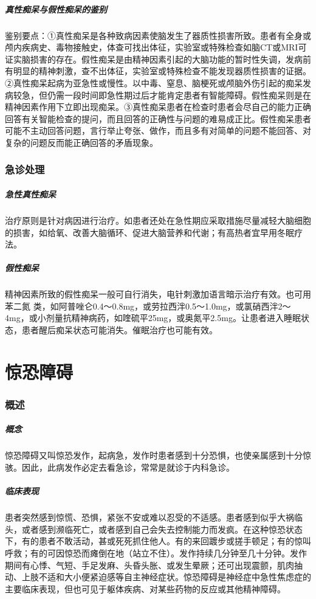\subparagraph{真性痴呆与假性痴呆的鉴别}

鉴别要点：①真性痴呆是各种致病因素使脑发生了器质性损害所致。患者有全身或颅内疾病史、毒物接触史，体查可找出体征，实验室或特殊检查如脑CT或MRI可证实脑损害的存在。假性痴呆是由精神因素引起的大脑功能的暂时性失调，发病前有明显的精神刺激，查不出体征，实验室或特殊检查不能发现器质性损害的证据。②真性痴呆起病为亚急性或慢性。以中毒、窒息、脑梗死或颅脑外伤引起的痴呆发病较急，但仍需一段时间即急性期过后才能肯定患者有智能障碍。假性痴呆则是在精神因素作用下立即出现痴呆。③真性痴呆患者在检查时患者会尽自己的能力正确回答有关智能检查的提问，而且回答的正确性与问题的难易成正比。假性痴呆患者可能不主动回答问题，言行举止夸张、做作，而且多有对简单的问题不能回答、对复杂的问题反而能正确回答的矛盾现象。

\subsubsection{急诊处理}

\subparagraph{急性真性痴呆}

治疗原则是针对病因进行治疗。如患者还处在急性期应采取措施尽量减轻大脑细胞的损害，如给氧、改善大脑循环、促进大脑营养和代谢；有高热者宜早用冬眠疗法。

\subparagraph{假性痴呆}

精神因素所致的假性痴呆一般可自行消失，电针刺激加语言暗示治疗有效。也可用苯二氮{}
类，如阿普唑仑0.4～0.8mg，或劳拉西泮0.5～1.0mg，或氯硝西泮2～4mg，或小剂量抗精神病药，如喹硫平25mg，或奥氮平2.5mg。让患者进入睡眠状态，患者醒后痴呆状态可能消失。催眠治疗也可能有效。

\protect\hypertarget{text00051.html}{}{}

\section{惊恐障碍}

\subsubsection{概述}

\subparagraph{概念}

惊恐障碍又叫惊恐发作，起病急，发作时患者感到十分恐惧，也使亲属感到十分惊骇。因此，此病发作必定去看急诊，常常是就诊于内科急诊。

\subparagraph{临床表现}

患者突然感到惊慌、恐惧，紧张不安或难以忍受的不适感。患者感到似乎大祸临头，或者感到濒临死亡，或者感到自己会失去控制能力而发疯。在这种惊恐状态下，有的患者不敢活动，甚或死死抓住他人。有的来回踱步或搓手顿足；有的惊叫呼救；有的可因惊恐而瘫倒在地（站立不住）。发作持续几分钟至几十分钟。发作期间有心悸、气短、手足发麻、头昏头胀、或发生晕厥；还可出现震颤，肌肉抽动、上肢不适和大小便紧迫感等自主神经症状。惊恐障碍是神经症中急性焦虑症的主要临床表现，但也可见于躯体疾病、对某些药物的反应或其他精神障碍。

